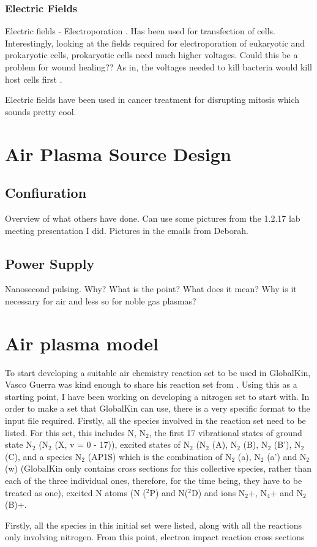 \documentclass[11pt, oneside]{article}   	%
\begin{document}
\subsubsection{Electric Fields}
Electric fields - Electroporation \cite{Weaver1994molecular, Weaver2000electroporation}. Has been used for transfection of cells.
Interestingly, looking at the fields required for electroporation of eukaryotic and prokaryotic cells, prokaryotic cells need much higher voltages. Could this be a problem for wound healing?? As in, the voltages needed to kill bacteria would kill host cells first \cite{ElectroporationGuide}.

Electric fields have been used in cancer treatment for disrupting mitosis \cite{Giladi2014mitotic} which sounds pretty cool.






\section{Air Plasma Source Design}
\subsection{Confiuration}

Overview of what others have done. Can use some pictures from the 1.2.17 lab meeting presentation I did.
Pictures in the emails from Deborah.

\subsection{Power Supply}
Nanosecond pulsing.
Why? What is the point? What does it mean? Why is it necessary for air and less so for noble gas plasmas?

\section{Air plasma model}
To start developing a suitable air chemistry reaction set to be used in GlobalKin, Vasco Guerra was kind enough to share his reaction set from \cite{Kutasi2016tuning}.
Using this as a starting point, I have been working on developing a nitrogen set to start with. 
In order to make a set that GlobalKin can use, there is a very specific format to the input file required.
Firstly, all the species involved in the reaction set need to be listed.
For this set, this includes N, N$_2$, the first 17 vibrational states of ground state N$_2$ (N$_2$ (X, v = 0 - 17)), excited states of N$_2$ (N$_2$ (A), N$_2$ (B), N$_2$ (B'), N$_2$ (C), and a species N$_2$ (AP1S) which is the combination of N$_2$ (a), N$_2$ (a') and N$_2$ (w) (GlobalKin only contains cross sections for this collective species, rather than each of the three individual ones, therefore, for the time being, they have to be treated as one), excited N atoms (N ($^2$P) and N($^2$D) and ions N$_2$+, N$_4$+ and N$_2$ (B)+.

Firstly, all the species in this initial set were listed, along with all the reactions only involving nitrogen. 
From this point, electron impact reaction cross sections 





\end{document}
